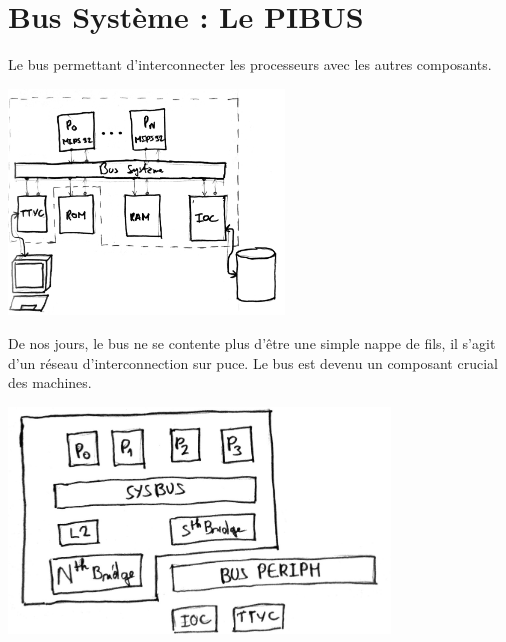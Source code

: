 
\section{Bus Système : Le PIBUS}

Le bus permettant d'interconnecter les processeurs avec les autres composants.
\begin{center}
  \includegraphics[height=6cm]{cours2/pics/bus.jpg}
\end{center}
De nos jours, le bus ne se contente plus d'être une simple nappe de fils, il s'agit d'un
réseau d'interconnection sur puce. Le bus est devenu un composant crucial des
machines.
\begin{center}
  \includegraphics[height=6cm]{cours2/pics/modern.jpg}
\end{center}

